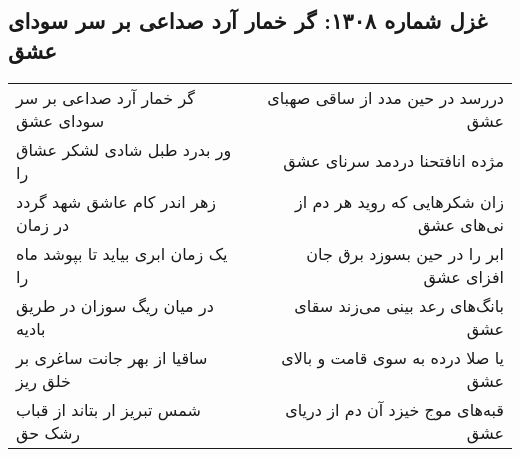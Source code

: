 \begin{center}
\section*{غزل شماره ۱۳۰۸: گر خمار آرد صداعی بر سر سودای عشق}
\label{sec:1308}
\begin{longtable}{l p{0.5cm} r}
گر خمار آرد صداعی بر سر سودای عشق
&&
دررسد در حین مدد از ساقی صهبای عشق
\\
ور بدرد طبل شادی لشکر عشاق را
&&
مژده انافتحنا دردمد سرنای عشق
\\
زهر اندر کام عاشق شهد گردد در زمان
&&
زان شکرهایی که روید هر دم از نی‌های عشق
\\
یک زمان ابری بیاید تا بپوشد ماه را
&&
ابر را در حین بسوزد برق جان افزای عشق
\\
در میان ریگ سوزان در طریق بادیه
&&
بانگ‌های رعد بینی می‌زند سقای عشق
\\
ساقیا از بهر جانت ساغری بر خلق ریز
&&
یا صلا درده به سوی قامت و بالای عشق
\\
شمس تبریز ار بتاند از قباب رشک حق
&&
قبه‌های موج خیزد آن دم از دریای عشق
\\
\end{longtable}
\end{center}
